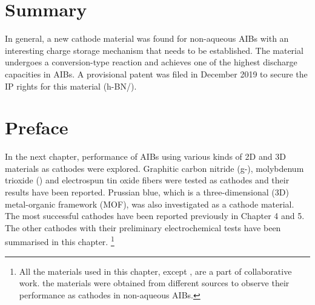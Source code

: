 \section{Summary}
In general, a new cathode material was found for non-aqueous AIBs with an interesting charge storage mechanism that needs to be established. The material undergoes a conversion-type reaction and achieves one of the highest discharge capacities in AIBs. A provisional patent was filed in December 2019 to secure the IP rights for this material (h-BN/).

\newpage
\section*{Preface}
In the next chapter, performance of AIBs using various kinds of 2D and 3D materials as cathodes were explored. Graphitic carbon nitride (g-), molybdenum trioxide () and electrospun tin oxide  fibers were tested as cathodes and their results have been reported. Prussian blue, which is a three-dimensional (3D) metal-organic framework (MOF), was also investigated as a cathode material. The most successful cathodes have been reported previously in Chapter 4 and 5. The other cathodes with their preliminary electrochemical tests have been summarised in this chapter. \footnote{All the materials used in this chapter, except , are a part of collaborative work. the  materials were obtained from different sources to observe their performance as cathodes in non-aqueous AIBs.}
  